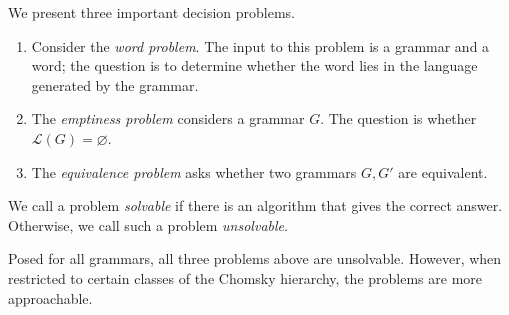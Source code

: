 We present three important decision problems.
\begin{enumerate}
	\item Consider the \emph{word problem}.
		The input to this problem is a grammar and a word; the question is to determine whether the word lies in the language generated by the grammar.
	\item The \emph{emptiness problem} considers a grammar \( G \).
		The question is whether \( \mathcal L(G) = \varnothing \).
	\item The \emph{equivalence problem} asks whether two grammars \( G, G' \) are equivalent.
\end{enumerate}
\begin{definition}
	We call a problem \emph{solvable} if there is an algorithm that gives the correct answer.
	Otherwise, we call such a problem \emph{unsolvable}.
\end{definition}
Posed for all grammars, all three problems above are unsolvable.
However, when restricted to certain classes of the Chomsky hierarchy, the problems are more approachable.
